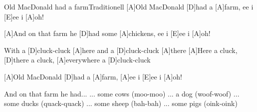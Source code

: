 \documentclass[../main.tex]{subfiles}
\begin{document}
\begin{song}{Old MacDonald had a farm}{Traditionell}{}
[A]Old MacDonald [D]had a [A]farm, ee i [E]ee i [A]oh!

[A]And on that farm he [D]had some [A]chickens, ee i [E]ee i [A]oh!

With a [D]cluck-cluck [A]here and a [D]cluck-cluck [A]there
[A]Here a cluck, [D]there a cluck, [A]everywhere a [D]cluck-cluck

[A]Old MacDonald [D]had a [A]farm, [A]ee i [E]ee i [A]oh!


And on that farm he had...
\hh... some cows (moo-moo)
\hh... a dog (woof-woof)
\hh... some ducks (quack-quack)
\hh... some sheep (bah-bah)
\hh... some pigs (oink-oink)
\end{song}
\end{document}
